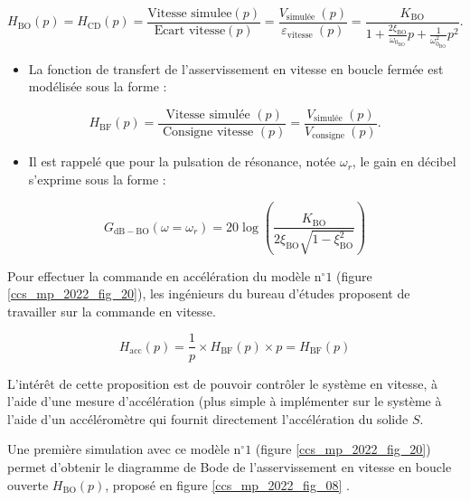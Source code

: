 $$
H_{\mathrm{BO}}(p)=H_{\mathrm{CD}}(p)=\frac{\text{Vitesse simulee}(p)}{\text{Ecart vitesse}(p)}=\frac{V_{\text {simulée }}(p)}{\varepsilon_{\text {vitesse }}(p)}=\frac{K_{\mathrm{BO}}}{1+\frac{2 \xi_{\mathrm{BO}}}{\omega_{0_{\mathrm{BO}}}} p+\frac{1}{\omega_{0_{\mathrm{BO}}}^{2}} p^{2}} .
$$

\begin{itemize}
  \item La fonction de transfert de l'asservissement en vitesse en boucle fermée est modélisée sous la forme :
\end{itemize}

$$
H_{\mathrm{BF}}(p)=\frac{\text { Vitesse simulée }(p)}{\text { Consigne vitesse }(p)}=\frac{V_{\text {simulée }}(p)}{V_{\text {consigne }}(p)} .
$$

\begin{itemize}
  \item Il est rappelé que pour la pulsation de résonance, notée $\omega_{r}$, le gain en décibel s'exprime sous la forme :
\end{itemize}

$$
G_{\mathrm{dB}-\mathrm{BO}}\left(\omega=\omega_{r}\right)=20 \log \left(\frac{K_{\mathrm{BO}}}{2 \xi_{\mathrm{BO}} \sqrt{1-\xi_{\mathrm{BO}}^{2}}}\right)
$$

Pour effectuer la commande en accélération du modèle $\mathrm{n}^{\circ} 1$ (figure \ref{ccs_mp_2022_fig_20}), les ingénieurs du bureau d'études proposent de travailler sur la commande en vitesse.
\fi

\ifprof
\begin{corrige}
$$H_\text{acc}(p) = \dfrac{1}{{p}} \times H_\text{BF}(p) \times {p} = H_\text{BF}(p)$$

L'intérêt de cette proposition est de pouvoir contrôler le système en vitesse, à l'aide d'une mesure d'accélération (plus simple à implémenter sur le système à l'aide d'un accéléromètre qui fournit directement l'accélération du solide $S$.
\end{corrige}
\else
\fi

\ifprof
\else
Une première simulation avec ce modèle $\mathrm{n}^{\circ} 1$ (figure \ref{ccs_mp_2022_fig_20}) permet d'obtenir le diagramme de Bode de l'asservissement en vitesse en boucle ouverte $H_{\mathrm{BO}}(p)$, proposé en figure \ref{ccs_mp_2022_fig_08} .

